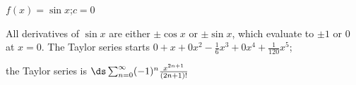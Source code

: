 {$f(x) = \sin x$;\quad $c=0$
}
{All derivatives of $\sin x$ are either $\pm\cos x$ or $\pm \sin x$, which evaluate to $\pm 1$ or $0$ at $x=0$. The Taylor series starts $0+x+0x^2-\frac16x^3+0x^4+\frac1{120}x^5$; 

the Taylor series is $\ds \sum_{n=0}^\infty (-1)^n\frac{x^{2n+1}}{(2n+1)!}$
}